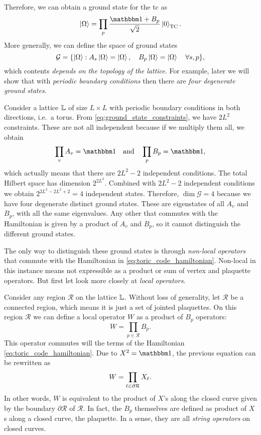 Therefore, we can obtain a ground state for the \ac{tc} as
\begin{equation}
    \ket{\Omega} = \prod_{p} \frac{\identity + B_p}{\sqrt{2}} \ket{0}_{\text{TC}}.
\end{equation}
More generally, we can define the space of ground states
\begin{equation}
    \mathcal{G} = \qty{ \ket{\Omega} : A_s \ket{\Omega} = \ket{\Omega}, \quad B_p \ket{\Omega} = \ket{\Omega} \quad \forall s, p },
    \label{eq:TC_protected_subspace}
\end{equation}
which contents \emph{depends on the topology of the lattice}.
For example, later we will show that with \emph{periodic boundary conditions} then there are
\emph{four degenerate ground states}.


Consider a lattice $\mathbb{L}$ of size $L \times L$ with periodic boundary conditions in both directions, i.e.~a torus.
From \eqref{eq:ground_state_constraints}, we have $2L^2$ constraints.
These are not all independent because if we multiply them all, we obtain
\begin{equation}
    \prod_{v} A_v = \identity \qand
    \prod_{p} B_p = \identity,
\end{equation}
which actually means that there are $2L^2 - 2$ independent conditions.
The total Hilbert space has dimension $2^{2L^2}$.
Combined with $2L^2 - 2$ independent conditions we obtain $2^{2L^2 - 2L^2 + 2} = 4$ independent states.
Therefore, $\dim \mathcal{G} = 4$ because we have four degenerate distinct ground states.
These are eigenstates of all $A_v$ and $B_p$, with all the same eigenvalues.
Any other that commutes with the Hamiltonian is given by a product of $A_v$ and $B_p$, so it cannot distinguish the different ground states.


The only way to distinguish these ground states is through \emph{non-local operators} that commute with the Hamiltonian in \eqref{eq:toric_code_hamiltonian}.
Non-local in this instance means not expressible as a product or sum of vertex and plaquette operators.
But first let look more closely at \emph{local operators}.


Consider any region $\mathcal{R}$ on the lattice $\mathbb{L}$.
Without loss of generality, let $\mathcal{R}$ be a connected region, which means it is just a set of jointed plaquettes.
On this region $\mathcal{R}$ we can define a local operator $W$ as a product of $B_p$ operators:
\begin{equation}
    W = \prod_{p \in \mathcal{R}} B_p.
\end{equation}
This operator commutes will the terms of the Hamiltonian \eqref{eq:toric_code_hamiltonian}.
Due to $X^2 = \identity$, the previous equation can be rewritten as
\begin{equation}
    W = \prod_{\ell \in \partial \mathcal{R}} X_{\ell}.
\end{equation}
In other words, $W$ is equivalent to the product of $X$'s along the closed curve given by the boundary $\partial \mathcal{R}$ of $\mathcal{R}$.
In fact, the $B_p$ themselves are defined as product of $X$s along a closed curve, the plaquette.
In a sense, they are all \emph{string operators} on closed curves.

